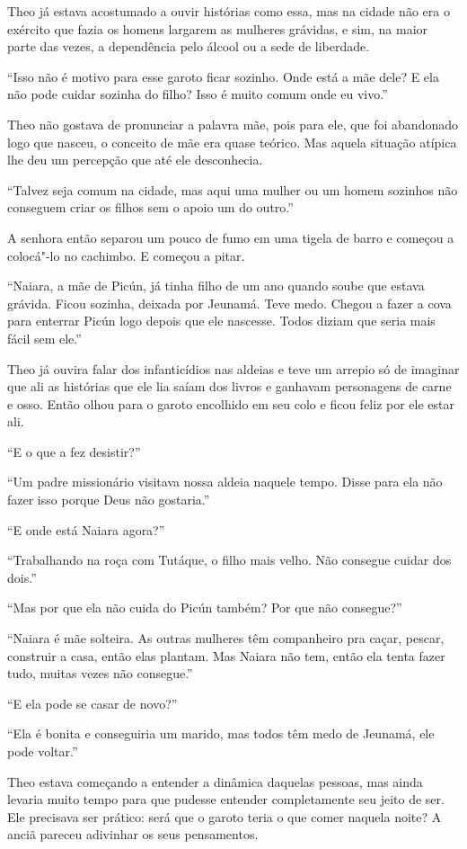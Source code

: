 Theo já estava acostumado a ouvir histórias como essa, mas na cidade não
era o exército que fazia os homens largarem as mulheres grávidas, e sim,
na maior parte das vezes, a dependência pelo álcool ou a sede de
liberdade.

``Isso não é motivo para esse garoto ficar sozinho. Onde está a mãe
dele? E ela não pode cuidar sozinha do filho? Isso é muito comum onde eu
vivo.''

Theo não gostava de pronunciar a palavra mãe, pois para ele, que foi
abandonado logo que nasceu, o conceito de mãe era quase teórico. Mas aquela
situação atípica lhe deu um percepção que até ele desconhecia.

``Talvez seja comum na cidade, mas aqui uma mulher ou um homem sozinhos
não conseguem criar os filhos sem o apoio um do outro.''

A senhora então separou um pouco de fumo em uma tigela de barro e
começou a colocá"-lo no cachimbo. E começou a pitar.

``Naiara, a mãe de Picún, já tinha filho de um ano quando soube que
estava grávida. Ficou sozinha, deixada por Jeunamá. Teve medo. Chegou a
fazer a cova para enterrar Picún logo depois que ele nascesse. Todos
diziam que seria mais fácil sem ele.''

Theo já ouvira falar dos infanticídios nas aldeias e teve um arrepio só
de imaginar que ali as histórias que ele lia saíam dos livros e ganhavam
personagens de carne e osso. Então olhou para o garoto encolhido em seu
colo e ficou feliz por ele estar ali.

``E o que a fez desistir?''

``Um padre missionário visitava nossa aldeia naquele tempo. Disse para
ela não fazer isso porque Deus não gostaria.''

``E onde está Naiara agora?''

``Trabalhando na roça com Tutáque, o filho mais velho. Não consegue
cuidar dos dois.''

``Mas por que ela não cuida do Picún também? Por que não consegue?''

``Naiara é mãe solteira. As outras mulheres têm companheiro pra caçar,
pescar, construir a casa, então elas plantam. Mas Naiara não tem, então
ela tenta fazer tudo, muitas vezes não consegue.''

``E ela pode se casar de novo?''

``Ela é bonita e conseguiria um marido, mas todos têm medo de Jeunamá,
ele pode voltar.''

Theo estava começando a entender a dinâmica daquelas pessoas, mas ainda
levaria muito tempo para que pudesse entender completamente seu jeito de
ser. Ele precisava ser prático: será que o garoto teria o que comer
naquela noite? A anciã pareceu adivinhar os seus pensamentos.


